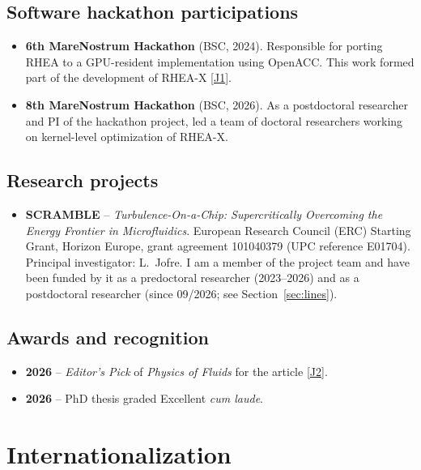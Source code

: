 \documentclass[11pt]{article}
\begin{document}
\subsection{Software hackathon participations}
\begin{itemize}
\item \textbf{6th MareNostrum Hackathon} (BSC, 2024).
Responsible for porting RHEA to a GPU-resident implementation using OpenACC. This work formed part of
the development of RHEA-X [\hyperlink{pub-J1}{J1}].\nocert

\item \textbf{8th MareNostrum Hackathon} (BSC, 2026).
As a postdoctoral researcher and PI of the hackathon project, led a team of doctoral researchers working on kernel-level optimization of RHEA-X.\nocert
\end{itemize}

\subsection{Research projects}\label{sec:projects}
\begin{itemize}
  \item \textbf{SCRAMBLE} -- \emph{Turbulence-On-a-Chip: Supercritically Overcoming the
  Energy Frontier in Microfluidics}. European Research Council (ERC) Starting Grant,
  Horizon Europe, grant agreement 101040379 (UPC reference E01704). Principal
  investigator: L.\ Jofre. I am a member of the project team and have been funded by it
  as a predoctoral researcher (2023--2026) and as a postdoctoral researcher (since
  09/2026; see Section~\ref{sec:lines}). 
\end{itemize}

\subsection{Awards and recognition}
\begin{itemize}
  \item \textbf{2026} -- \emph{Editor's Pick} of \emph{Physics of Fluids} for the article
  [\hyperlink{pub-J2}{J2}].
  \item \textbf{2026} -- PhD thesis graded Excellent \emph{cum laude}.
\end{itemize}

\section{Internationalization}
\end{document}
